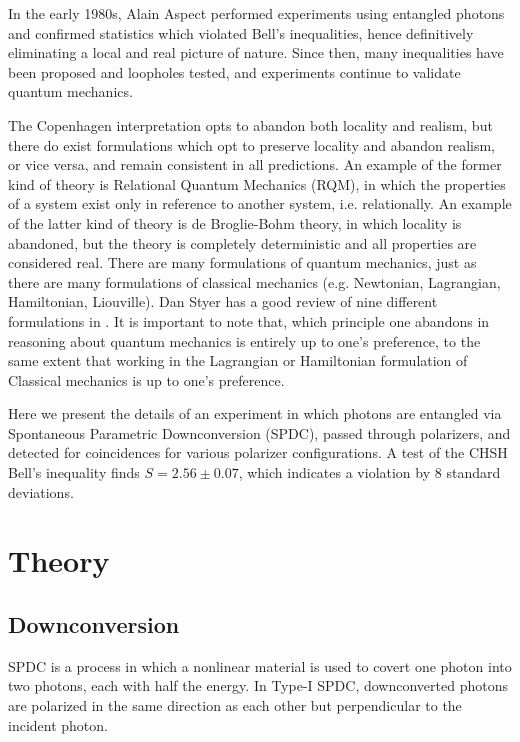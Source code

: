 \documentclass{article}
\let\Oldsection\section
\renewcommand{\section}{\FloatBarrier\Oldsection}
\let\Oldsubsection\subsection
\renewcommand{\subsection}{\FloatBarrier\Oldsubsection}
\begin{document}
In the early 1980s, Alain Aspect performed experiments using entangled photons and confirmed statistics which violated Bell's inequalities, hence definitively eliminating a local and real picture of nature.\cite{aspect} Since then, many inequalities have been proposed and loopholes tested, and experiments continue to validate quantum mechanics.

The Copenhagen interpretation opts to abandon both locality and realism, but there do exist formulations which opt to preserve locality and abandon realism, or vice versa, and remain consistent in all predictions. An example of the former kind of theory is Relational Quantum Mechanics (RQM), in which the properties of a system exist only in reference to another system, i.e. relationally.\cite{rovelli} An example of the latter kind of theory is de Broglie-Bohm theory, in which locality is abandoned, but the theory is completely deterministic and all properties are considered real.\cite{bohm} There are many formulations of quantum mechanics, just as there are many formulations of classical mechanics (e.g. Newtonian, Lagrangian, Hamiltonian, Liouville). Dan Styer has a good review of nine different formulations in \cite{styer}. It is important to note that, which principle one abandons in reasoning about quantum mechanics is entirely up to one's preference, to the same extent that working in the Lagrangian or Hamiltonian formulation of Classical mechanics is up to one's preference.

Here we present the details of an experiment in which photons are entangled via Spontaneous Parametric Downconversion (SPDC), passed through polarizers, and detected for coincidences for various polarizer configurations. A test of the CHSH Bell's inequality finds $S=2.56 \pm 0.07$, which indicates a violation by 8 standard deviations.

\section{Theory}

\subsection{Downconversion}

SPDC is a process in which a nonlinear material is used to covert one photon into two photons, each with half the energy. In Type-I SPDC, downconverted photons are polarized in the same direction as each other but perpendicular to the incident photon.
\end{document}
